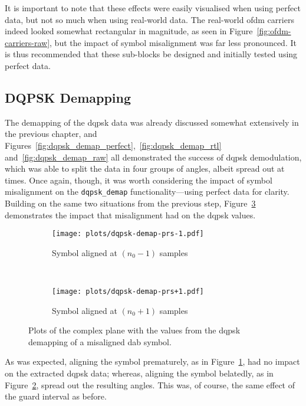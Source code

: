 \documentclass[class=report,11pt,crop=false]{standalone}
\begin{document}
It is important to note that these effects were easily visualised when using perfect data, but not so much when using real-world data. The real-world \gls{ofdm} carriers indeed looked somewhat rectangular in magnitude, as seen in Figure~\ref{fig:ofdm-carriers-raw}, but the impact of symbol misalignment was far less pronounced. It is thus recommended that these sub-blocks be designed and initially tested using perfect data.
  
\subsection{DQPSK Demapping}
The demapping of the \gls{dqpsk} data was already discussed somewhat extensively in the previous chapter, and Figures~\ref{fig:dqpsk_demap_perfect},~\ref{fig:dqpsk_demap_rtl} and~\ref{fig:dqpsk_demap_raw} all demonstrated the success of \gls{dqpsk} demodulation, which was able to split the data in four groups of angles, albeit spread out at times. Once again, though, it was worth considering the impact of symbol misalignment on the \texttt{dqpsk\_demap} functionality---using perfect data for clarity. Building on the same two situations from the previous step, Figure~\ref{fig:dqpsk-demap-prs} demonstrates the impact that misalignment had on the \gls{dqpsk} values.

\begin{figure}[htbp]
  \centering
  \captionsetup{type=figure}
  \begin{subfigure}[t]{0.45\textwidth}
    \centering
    \captionsetup{type=figure}
    \texttt{[image: plots/dqpsk-demap-prs-1.pdf]}
    \caption{Symbol aligned at \((n_0 - 1)\) samples}
    \label{fig:dqpsk-demap-prs-1}
  \end{subfigure}%
  ~ 
  \begin{subfigure}[t]{0.45\textwidth}
    \centering
    \captionsetup{type=figure}
    \texttt{[image: plots/dqpsk-demap-prs+1.pdf]}
    \caption{Symbol aligned at \((n_0 + 1)\) samples}
    \label{fig:dqpsk-demap-prs+1}
  \end{subfigure}
  \caption{Plots of the complex plane with the values from the \gls{dqpsk} demapping of a misaligned \gls{dab} symbol.}
  \label{fig:dqpsk-demap-prs}
\end{figure}

As was expected, aligning the symbol prematurely, as in Figure~\ref{fig:dqpsk-demap-prs-1}, had no impact on the extracted \gls{dqpsk} data; whereas, aligning the symbol belatedly, as in Figure~\ref{fig:dqpsk-demap-prs+1}, spread out the resulting angles. This was, of course, the same effect of the guard interval as before.
\end{document}
